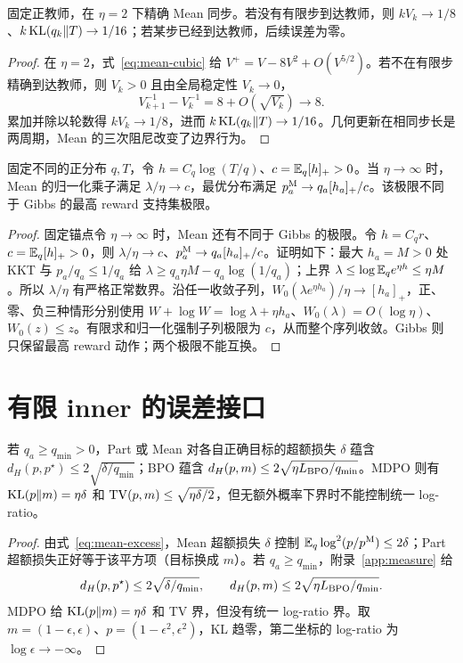 \begin{theorem}
固定正教师，在 $\eta=2$ 下精确 Mean 同步。若没有有限步到达教师，则 $kV_k\to1/8$、$k\operatorname{KL}(q_k\Vert T)\to1/16$；若某步已经到达教师，后续误差为零。
\end{theorem}
\begin{proof}
在 $\eta=2$，式~\eqref{eq:mean-cubic} 给 $V^+=V-8V^2+O(V^{5/2})$。若不在有限步精确到达教师，则 $V_k>0$ 且由全局稳定性 $V_k\to0$，
\begin{equation}
V_{k+1}^{-1}-V_k^{-1}=8+O(\sqrt{V_k})\to8.
\end{equation}
累加并除以轮数得 $kV_k\to1/8$，进而 $k\operatorname{KL}(q_k\Vert T)\to1/16$。几何更新在相同步长是两周期，Mean 的三次阻尼改变了边界行为。
\end{proof}

\begin{proposition}
固定不同的正分布 $q,T$，令 $h=C_q\log(T/q)$、$c=\mathbb E_q[h]_+>0$。当 $\eta\to\infty$ 时，Mean 的归一化乘子满足 $\lambda/\eta\to c$，最优分布满足 $p_a^{\rm M}\to q_a[h_a]_+/c$。该极限不同于 Gibbs 的最高 reward 支持集极限。
\end{proposition}
\begin{proof}
固定锚点令 $\eta\to\infty$ 时，Mean 还有不同于 Gibbs 的极限。令 $h=C_qr$、$c=\mathbb E_q[h]_+>0$，则 $\lambda/\eta\to c$、$p_a^{\rm M}\to q_a[h_a]_+/c$。证明如下：最大 $h_a=M>0$ 处 KKT 与 $p_a/q_a\le1/q_a$ 给 $\lambda\ge q_a\eta M-q_a\log(1/q_a)$；上界 $\lambda\le\log\mathbb E_qe^{\eta h}\le\eta M$。所以 $\lambda/\eta$ 有严格正常数界。沿任一收敛子列，$W_0(\lambda e^{\eta h_a})/\eta\to[h_a]_+$，正、零、负三种情形分别使用 $W+\log W=\log\lambda+\eta h_a$、$W_0(\lambda)=O(\log\eta)$、$W_0(z)\le z$。有限求和归一化强制子列极限为 $c$，从而整个序列收敛。Gibbs 则只保留最高 reward 动作；两个极限不能互换。
\end{proof}

\section{有限 inner 的误差接口}
\begin{proposition}[四种内层损失到输出误差的接口]
若 $q_a\ge q_{\min}>0$，Part 或 Mean 对各自正确目标的超额损失 $\delta$ 蕴含 $d_H(p,p^\star)\le2\sqrt{\delta/q_{\min}}$；BPO 蕴含 $d_H(p,m)\le2\sqrt{\eta L_{\rm BPO}/q_{\min}}$。MDPO 则有 $\operatorname{KL}(p\Vert m)=\eta\delta$ 和 $\operatorname{TV}(p,m)\le\sqrt{\eta\delta/2}$，但无额外概率下界时不能控制统一 log-ratio。
\end{proposition}
\begin{proof}
由式~\eqref{eq:mean-excess}，Mean 超额损失 $\delta$ 控制 $\mathbb E_q\log^2(p/p^{\rm M})\le2\delta$；Part 超额损失正好等于该平方项（目标换成 $m$）。若 $q_a\ge q_{\min}$，附录~\ref{app:measure} 给
\begin{equation}
d_H(p,p^\star)\le2\sqrt{\delta/q_{\min}},\qquad
d_H(p,m)\le2\sqrt{\eta L_{\rm BPO}/q_{\min}}.
\end{equation}
MDPO 给 $\operatorname{KL}(p\Vert m)=\eta\delta$ 和 TV 界，但没有统一 log-ratio 界。取 $m=(1-\epsilon,\epsilon)$、$p=(1-\epsilon^2,\epsilon^2)$，KL 趋零，第二坐标的 log-ratio 为 $\log\epsilon\to-\infty$。
\end{proof}

